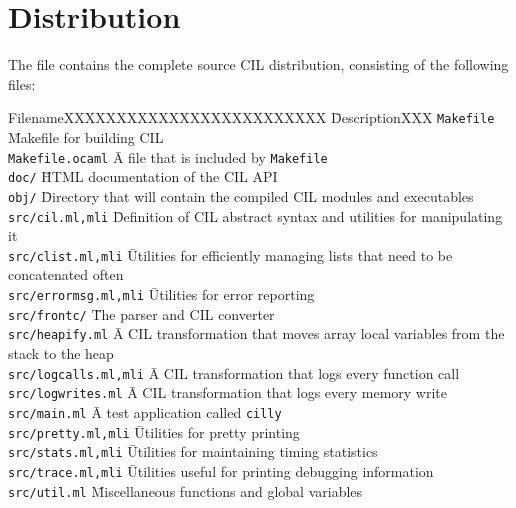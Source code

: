 \documentclass{article}
\newcommand{\t}[1]{{\tt #1}}
\begin{document}
\section{Distribution}

The file  contains the complete source CIL
distribution, consisting of the following files:

\begin{tabbing}
FilenameXXXXXXXXXXXXXXXXXXXXXXXXX \= DescriptionXXX \kill
\t{Makefile}                    \= Makefile for building CIL \\
\t{Makefile.ocaml}              \= A file that is included by \t{Makefile} \\
\t{doc/}                        \= HTML documentation of the CIL API \\
\t{obj/}                        \= Directory that will contain the compiled
                                   CIL modules and executables\\
\t{src/cil.ml,mli}              \= Definition of CIL abstract syntax and
                                   utilities for manipulating it\\
\t{src/clist.ml,mli}            \= Utilities for efficiently managing lists
                                   that need to be concatenated often\\
\t{src/errormsg.ml,mli}         \= Utilities for error reporting \\
\t{src/frontc/}                 \= The parser and CIL converter \\
\t{src/heapify.ml}              \= A CIL transformation that moves array local
                                   variables from the stack to the heap \\
\t{src/logcalls.ml,mli}         \= A CIL transformation that logs every
                                   function call \\
\t{src/logwrites.ml}            \= A CIL transformation that logs every memory
                                   write \\
\t{src/main.ml}                 \= A test application called \t{cilly} \\
\t{src/pretty.ml,mli}           \= Utilities for pretty printing \\
\t{src/stats.ml,mli}            \= Utilities for maintaining timing statistics
\\
\t{src/trace.ml,mli}            \= Utilities useful for printing debugging
                                   information\\
\t{src/util.ml}                 \= Miscellaneous functions and global variables
\end{tabbing}
\end{document}
